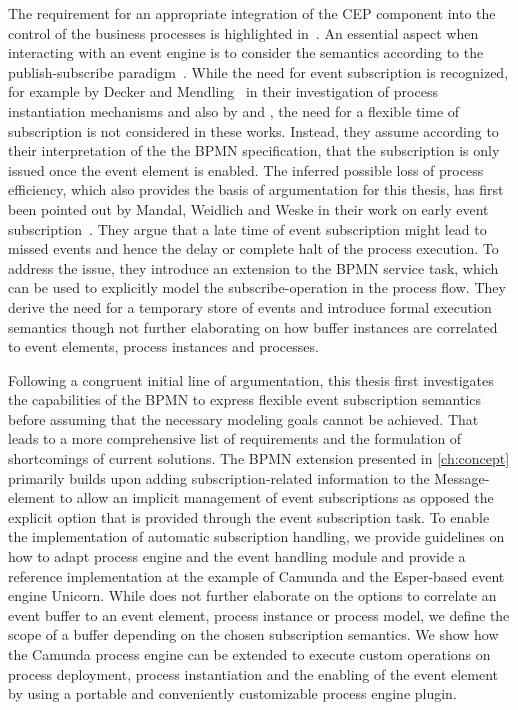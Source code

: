 The requirement for an appropriate integration of the CEP component into the control of the business processes is highlighted in~\cite{chandy2010event}.
An essential aspect when interacting with an event engine is to consider the semantics according to the publish-subscribe paradigm~\cite{luckham2008power}. 
While the need for event subscription is recognized, for example by Decker and Mendling~\cite{decker2008instantiation} in their investigation of process instantiation mechanisms and also by \cite{Pufahl2017} and \cite{von2010integrating}, the need for a flexible time of subscription is not considered in these works.
Instead, they assume according to their interpretation of the the \acs{BPMN} specification, that the subscription is only issued once the event element is enabled.
The inferred possible loss of process efficiency, which also provides the basis of argumentation for this thesis, has first been pointed out by Mandal, Weidlich and Weske in their work on early event subscription~\cite{mandal:2017}.
They argue that a late time of event subscription might lead to missed events and hence the delay or complete halt of the process execution. To address the issue, they introduce an extension to the BPMN service task, which can be used to explicitly model the subscribe-operation in the process flow. They derive the need for a temporary store of events and introduce formal execution semantics though not further elaborating on how buffer instances are correlated to event elements, process instances and processes.

Following a congruent initial line of argumentation, this thesis first investigates the capabilities of the BPMN to express flexible event subscription semantics before assuming that the necessary modeling goals cannot be achieved. That leads to a more comprehensive list of requirements and the formulation of shortcomings of current solutions.
The BPMN extension presented in \autoref{ch:concept} primarily builds upon adding subscription-related information to the Message-element to allow an implicit management of event subscriptions as opposed the explicit option that is provided through the event subscription task.
To enable the implementation of automatic subscription handling, we provide guidelines on how to adapt process engine and the event handling module and provide a reference implementation at the example of Camunda and the Esper-based event engine Unicorn.
While \cite{mandal:2017} does not further elaborate on the options to correlate an event buffer to an event element, process instance or process model, we define the scope of a buffer depending on the chosen subscription semantics.
We show how the Camunda process engine can be extended to execute custom operations on process deployment, process instantiation and the enabling of the event element by using a portable and conveniently customizable process engine plugin. %

